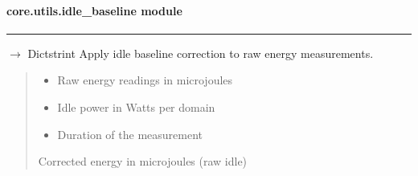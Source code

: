 \documentclass[letterpaper,10pt,english]{sphinxmanual}
\begin{document}
\sphinxstepscope


\paragraph{core.utils.idle\_baseline module}
\label{\detokenize{core.utils.idle_baseline:module-core.utils.idle_baseline}}\label{\detokenize{core.utils.idle_baseline:core-utils-idle-baseline-module}}\label{\detokenize{core.utils.idle_baseline::doc}}

\bigskip\hrule\bigskip


\begin{fulllineitems}
\label{\detokenize{core.utils.idle_baseline:core.utils.idle_baseline.apply_baseline_correction}}
\pysigstartsignatures
\pysiglinewithargsret
{}
{\sphinxparamcomma {}\sphinxparamcomma {}}
{{ $\rightarrow$ Dict\DUrole{p}{{[}}strint\DUrole{p}{{]}}}}
\pysigstopsignatures
\sphinxAtStartPar
Apply idle baseline correction to raw energy measurements.
\begin{quote}\begin{description}
\begin{itemize}
\item {} 
\sphinxAtStartPar
{} \textendash{} Raw energy readings in microjoules

\item {} 
\sphinxAtStartPar
{} \textendash{} Idle power in Watts per domain

\item {} 
\sphinxAtStartPar
{} \textendash{} Duration of the measurement

\end{itemize}

\sphinxAtStartPar
Corrected energy in microjoules (raw \sphinxhyphen{} idle)

\end{description}\end{quote}

\end{fulllineitems}
\end{document}

